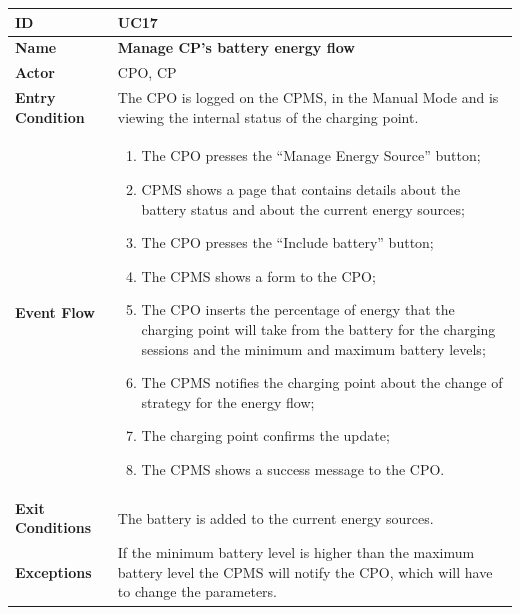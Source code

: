 \documentclass{Configuration_Files/PoliMi3i_thesis}
\begin{document}

\begin{table}[H]
    \begin{xltabular}{\textwidth}{| >{}l | X |}
    \hline
    \textbf{ID} & \textbf{UC17}\T\B\\
    \hline
    \textbf{Name} & \textbf{Manage CP’s battery  energy flow}\T\B\\
    \hline \hline
    \textbf{Actor} & CPO, CP\T\B \\
    \hline
    \textbf{Entry Condition} & The CPO is logged on the CPMS, in the Manual Mode and is viewing the internal status of the charging point.\T\B\\
    \hline
    \textbf{Event Flow} & 
        \begin{enumerate}
        \item The CPO presses the “Manage Energy Source” button;
        \item CPMS shows a page that contains details about the battery status and about the current energy sources;
        \item The CPO presses the “Include battery” button;
        \item The CPMS shows a form to the CPO;
        \item The CPO inserts the percentage of energy that the charging point will take from the battery for the charging sessions and the minimum and maximum battery levels;
        \item The CPMS notifies the charging point about the change of strategy for the energy flow;
        \item The charging point confirms the update;
        \item The CPMS shows a success message to the CPO.
        \end{enumerate}\B\\
    \hline
    \textbf{Exit Conditions} & The battery is added to the current energy sources.\B\\
    \hline
    \textbf{Exceptions} & If the minimum battery level is higher than the maximum battery level the CPMS will notify the CPO, which will have to change the parameters.\B\\
    \hline
    \end{xltabular}
\end{table}
\end{document}

